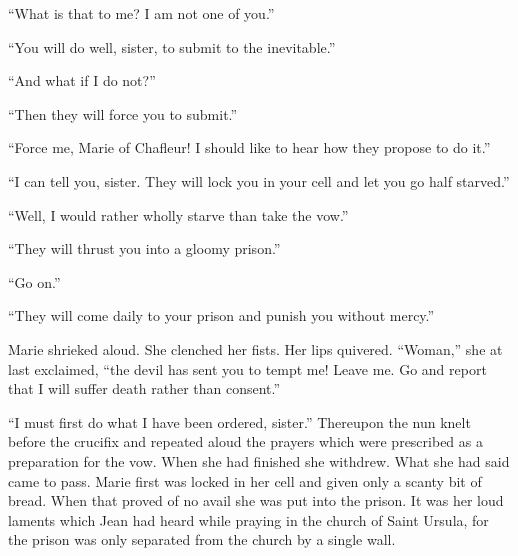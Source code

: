 ``What is that to me? I am not one of you.''

``You will do well, sister, to submit to the inevitable.''

``And what if I do not?''

``Then they will force you to submit.''

``Force me, Marie of Chafleur! I should like to hear how they propose to
do it.''

``I can tell you, sister. They will lock you in your cell and let you go
half starved.''

``Well, I would rather wholly starve than take the vow.''

``They will thrust you into a gloomy prison.''

``Go on.''

``They will come daily to your prison and punish you without mercy.''

Marie shrieked aloud. She clenched her fists. Her lips quivered.
``Woman,'' she at last exclaimed, ``the devil has sent you to tempt me!
Leave me. Go and report that I will suffer death rather than consent.''

``I must first do what I have been ordered, sister.'' Thereupon the nun
knelt before the crucifix and repeated aloud the prayers which were
prescribed as a preparation for the vow. When she had finished she
withdrew. What she had said came to pass. Marie first was locked in her
cell and given only a scanty bit of bread. When that proved of no avail
she was put into the prison. It was her loud laments which Jean had
heard while praying in the church of Saint Ursula, for the prison was
only separated from the church by a single wall.

\threeast
